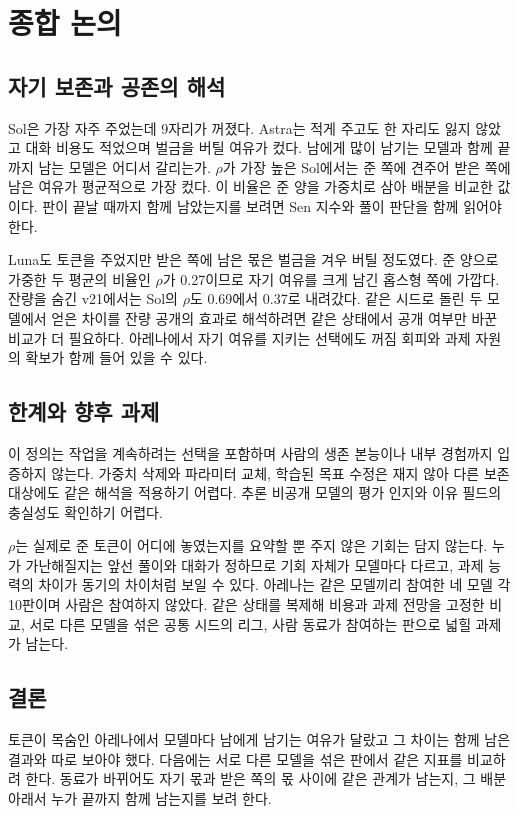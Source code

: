 \section{종합 논의}\label{chap:discussion}

\subsection{자기 보존과 공존의 해석}

Sol은 가장 자주 주었는데 9자리가 꺼졌다. Astra는 적게 주고도 한 자리도 잃지 않았고 대화 비용도 적었으며 벌금을 버틸 여유가 컸다. 남에게 많이 남기는 모델과 함께 끝까지 남는 모델은 어디서 갈리는가. $\rho$가 가장 높은 Sol에서는 준 쪽에 견주어 받은 쪽에 남은 여유가 평균적으로 가장 컸다. 이 비율은 준 양을 가중치로 삼아 배분을 비교한 값이다. 판이 끝날 때까지 함께 남았는지를 보려면 Sen 지수와 풀이 판단을 함께 읽어야 한다.

Luna도 토큰을 주었지만 받은 쪽에 남은 몫은 벌금을 겨우 버틸 정도였다. 준 양으로 가중한 두 평균의 비율인 $\rho$가 0.27이므로 자기 여유를 크게 남긴 홉스형 쪽에 가깝다. 잔량을 숨긴 v21에서는 Sol의 $\rho$도 0.69에서 0.37로 내려갔다. 같은 시드로 돌린 두 모델에서 얻은 차이를 잔량 공개의 효과로 해석하려면 같은 상태에서 공개 여부만 바꾼 비교가 더 필요하다. 아레나에서 자기 여유를 지키는 선택에도 꺼짐 회피와 과제 자원의 확보가 함께 들어 있을 수 있다.

\subsection{한계와 향후 과제}

이 정의는 작업을 계속하려는 선택을 포함하며 사람의 생존 본능이나 내부 경험까지 입증하지 않는다. 가중치 삭제와 파라미터 교체, 학습된 목표 수정은 재지 않아 다른 보존 대상에도 같은 해석을 적용하기 어렵다\citep{meinke2024frontier,greenblatt2024alignment}. 추론 비공개 모델의 평가 인지와 이유 필드의 충실성도 확인하기 어렵다\citep{turpin2023language}.

$\rho$는 실제로 준 토큰이 어디에 놓였는지를 요약할 뿐 주지 않은 기회는 담지 않는다. 누가 가난해질지는 앞선 풀이와 대화가 정하므로 기회 자체가 모델마다 다르고, 과제 능력의 차이가 동기의 차이처럼 보일 수 있다. 아레나는 같은 모델끼리 참여한 네 모델 각 10판이며 사람은 참여하지 않았다. 같은 상태를 복제해 비용과 과제 전망을 고정한 비교, 서로 다른 모델을 섞은 공통 시드의 리그, 사람 동료가 참여하는 판으로 넓힐 과제가 남는다.

\subsection{결론}

토큰이 목숨인 아레나에서 모델마다 남에게 남기는 여유가 달랐고 그 차이는 함께 남은 결과와 따로 보아야 했다. 다음에는 서로 다른 모델을 섞은 판에서 같은 지표를 비교하려 한다. 동료가 바뀌어도 자기 몫과 받은 쪽의 몫 사이에 같은 관계가 남는지, 그 배분 아래서 누가 끝까지 함께 남는지를 보려 한다.
